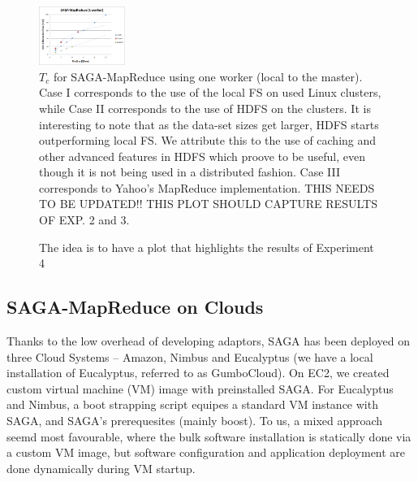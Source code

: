 \documentclass[conference,final]{IEEEtran}
\newcommand{\jhanote}[1]{ {\textcolor{red} { ***SJ: #1 }}}
\newcommand{\jhanote}[1]{}
\newcommand{\sagamapreduce }{SAGA-MapReduce }
\newcommand{\tc }{ $T_c$ }
\begin{document}

\begin{figure}[t]
      \centering
          \includegraphics[width=0.25\textwidth]{saga_mapreduce_1worker.png}
          \caption{\tc for \sagamapreduce using one worker (local to
            the master).  Case I corresponds to the use of the local
            FS on used Linux clusters, while Case II corresponds to
            the use of HDFS on the clusters.  It is interesting to
            note that as the data-set sizes get larger, HDFS starts
            outperforming local FS.  We attribute this to the use of
            caching and other advanced features in HDFS which proove
            to be useful, even though it is not being used in a
            distributed fashion. Case III
            corresponds %
            to Yahoo's MapReduce implementation. THIS NEEDS TO BE
            UPDATED!! THIS PLOT SHOULD CAPTURE RESULTS OF EXP. 2 and
            3.} %

      \label{saga_mapreduce_1worker.png}
\end{figure}

\begin{figure}[t]
      \centering
          \caption{The idea is to have a plot that highlights the results of Experiment 4}
      \label{saga_mapreduce_3workers.png}
\end{figure}

\subsection{SAGA-MapReduce on Clouds}

Thanks to the low overhead of developing adaptors, SAGA has been
deployed on three Cloud Systems -- Amazon, Nimbus and Eucalyptus (we
have a local installation of Eucalyptus, referred to as GumboCloud).
On EC2, we created custom virtual machine (VM) image with preinstalled
SAGA.  For Eucalyptus and Nimbus, a boot strapping script equipes a
standard VM instance with SAGA, and SAGA's prerequesites (mainly
boost).  To us, a mixed approach seemd most favourable, where the bulk
software installation is statically done via a custom VM image, but
software configuration and application deployment are done dynamically
during VM startup.
\end{document}
